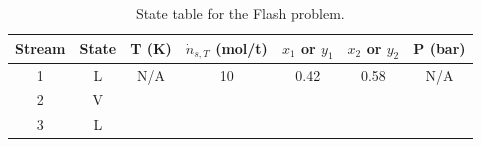 {    \clearpage
    
    \begin{table}[!ht]
      \centering
      \caption{State table for the Flash problem.}\label{tbl-state-flash-problem}
      \renewcommand{\arraystretch}{2.0}
      \setlength{\tabcolsep}{18pt}
      \begin{tabular}{c|c|c|c|c|c|c}\toprule
      Stream & State & T (K) & $\dot{n}_{s,T}$ (mol/t) & $x_{1}$ or $y_{1}$ & $x_{2}$ or $y_{2}$ & P (bar) \\ \toprule
      1 & L & N/A & 10 & 0.42 & 0.58 & N/A \\ \hline
      2 & V & & & & &  \\ \hline
      3 & L & & & & &  \\ \bottomrule
      \end{tabular}
    \end{table}}